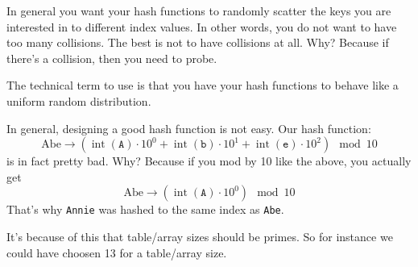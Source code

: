 
In general you want your hash functions to randomly
scatter the keys you are interested in to different index values.
In other words, you do not want to have too many collisions.
The best is not to have collisions at all.
Why?
Because if there's a collision, then you need to probe.

The technical term to use is that you have your
hash functions to behave like a uniform random distribution.

In general, designing a good hash function is not easy.
Our hash function:
\[
\text{Abe}
\rightarrow
(\operatorname{int}(\texttt{A}) \cdot 10^0 +
\operatorname{int}(\texttt{b}) \cdot 10^1 +
\operatorname{int}(\texttt{e}) \cdot 10^2) 
\mod 10
\]
is in fact pretty bad.
Why?
Because if you mod by 10 like the above, you actually get
\[
\text{Abe}
\rightarrow
(\operatorname{int}(\texttt{A}) \cdot 10^0)
\mod 10
\]
That's why \verb!Annie! was hashed to the same index as \verb!Abe!.

It's because of this that table/array sizes should be primes.
So for instance we 
could have choosen 13 for a table/array size.




\newpage
